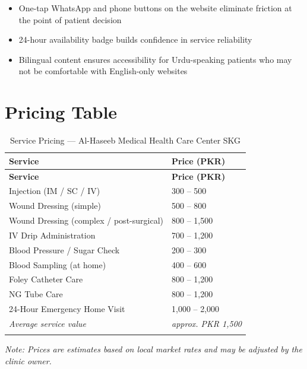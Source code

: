 \documentclass[12pt, a4paper]{article}
\begin{document}
\begin{itemize}[leftmargin=1.4em]
    \item One-tap WhatsApp and phone buttons on the website eliminate friction at the point of patient decision
    \item 24-hour availability badge builds confidence in service reliability
    \item Bilingual content ensures accessibility for Urdu-speaking patients who may not be comfortable with English-only websites
\end{itemize}

\newpage

\section{Pricing Table}\label{sec:pricing}

\begin{longtable}{@{} L{8cm} R{6.4cm} @{}}
\toprule
\textbf{Service} & \textbf{Price (PKR)} \\
\midrule
\endfirsthead
\toprule
\textbf{Service} & \textbf{Price (PKR)} \\
\midrule
\endhead
Injection (IM / SC / IV) & 300 – 500 \\[4pt]
Wound Dressing (simple) & 500 – 800 \\[4pt]
Wound Dressing (complex / post-surgical) & 800 – 1,500 \\[4pt]
IV Drip Administration & 700 – 1,200 \\[4pt]
Blood Pressure / Sugar Check & 200 – 300 \\[4pt]
Blood Sampling (at home) & 400 – 600 \\[4pt]
Foley Catheter Care & 800 – 1,200 \\[4pt]
NG Tube Care & 800 – 1,200 \\[4pt]
24-Hour Emergency Home Visit & 1,000 – 2,000 \\
\midrule
\textit{Average service value} & \textit{approx. PKR 1,500} \\
\bottomrule
\caption{Service Pricing — Al-Haseeb Medical Health Care Center SKG}
\end{longtable}

\textit{Note: Prices are estimates based on local market rates and may be adjusted by the clinic owner.}

\newpage
\end{document}
